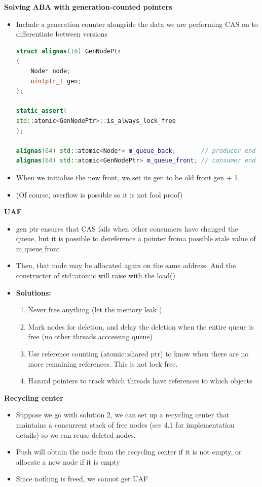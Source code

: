 \documentclass[10pt, landscape]{article}
\begin{document}
\begin{multicols}{4}
\textbf{Solving ABA with generation-counted pointers} \\ 
\begin{itemize}
    \item Include a generation counter alongside the data we are performing CAS on  to differentiate between versions
    \begin{lstlisting}[language=c++,breaklines=true, breakatwhitespace=true]
struct alignas(16) GenNodePtr
{
    Node* node;
    uintptr_t gen;
};

static_assert(
std::atomic<GenNodePtr>::is_always_lock_free
);

alignas(64) std::atomic<Node*> m_queue_back;       // producer end
alignas(64) std::atomic<GenNodePtr> m_queue_front; // consumer end
    \end{lstlisting}
    \item When we initialise the new front, we set its gen to be old front.gen + 1.
    \item (Of course, overflow is possible so it is not fool proof)
\end{itemize}

\textbf{UAF} \\ 
\begin{itemize}
    \item gen ptr ensures that CAS fails when other consumers have changed the queue, but it is possible to dereference a pointer froma possible stale value of m$\_$queue$\_$front
    \item Then, that node may be allocated again on the same address. And the constructor of std::atomic will raise with the load()
    \item \textbf{Solutions:} 
    \begin{enumerate}
        \item Never free anything (let the memory leak )
        \item Mark nodes for deletion, and delay the deletion when the entire queue is free (no other threads acccessing queue)
        \item Use reference counting (atomic::shared ptr) to know when there are no more remaining references. This is not lock free.
        \item Hazard pointers to track which threads have references to which objects
    \end{enumerate}
\end{itemize}

\textbf{Recycling center} \\
\begin{itemize}
    \item Suppose we go with solution 2, we can set up a recycling center that maintains a concurrent stack of free nodes (see 4.1 for implementation details) so we can reuse deleted nodes.
    \item Push will obtain the node from the recycling center if it is not empty, or allocate a new node if it is empty
    \item Since nothing is freed, we cannot get UAF
\end{itemize}


\end{multicols}
\end{document}
